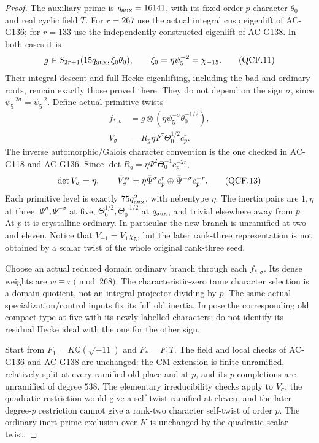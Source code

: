\begin{proof}
The auxiliary prime is \(q_{\rm aux}=16141\), with its fixed
order-\(p\) character \(\theta_0\) and real cyclic field \(T\).
For \(r=267\) use the actual integral cusp eigenlift of AC-G136;
for \(r=133\) use the independently constructed eigenlift of
AC-G138.  In both cases it is
\[
       g\in S_{2r+1}(15q_{\rm aux},\xi_0\theta_0),
       \qquad \xi_0=\eta\psi_5^{-2}=\chi_{-15}.
 \tag{QCF.11}
\]
Their integral descent and full Hecke eigenlifting, including the
bad and ordinary roots, remain exactly those proved there.  They
do not depend on the sign \(\sigma\), since
\(\psi_5^{-2\sigma}=\psi_5^{-2}\).
Define actual primitive twists
\[
 \begin{split}
 f_{*,\sigma}&=g\otimes
                 (\eta\psi_5^{-\sigma}\theta_0^{-1/2}),\\
 V_\sigma&=R_g\eta\Psi^\sigma\Theta_0^{1/2}c_p^r.
 \end{split}
 \tag{QCF.12}
\]
The inverse automorphic/Galois character convention is the one
checked in AC-G118 and AC-G136.  Since
\(\det R_g=\eta\Psi^2\Theta_0^{-1}c_p^{-2r}\),
\[
 \det V_\sigma=\eta,\qquad
 \bar V_\sigma^{\rm ss}=
     \eta\bar\Psi^\sigma\bar c_p^r
           \oplus\bar\Psi^{-\sigma}\bar c_p^{-r}.
 \tag{QCF.13}
\]
Each primitive level is exactly \(75q_{\rm aux}^2\), with
nebentype \(\eta\).  The inertia pairs are
\(1,\eta\) at three, \(\Psi^\sigma,\Psi^{-\sigma}\) at five,
\(\Theta_0^{1/2},\Theta_0^{-1/2}\) at \(q_{\rm aux}\),
and trivial elsewhere away from \(p\).  At \(p\) it is
crystalline ordinary.  In particular the new branch is unramified
at two and eleven.  Notice that \(V_{-1}=V_1\chi_5\), but
the later rank-three representation is not obtained by a scalar
twist of the whole original rank-three seed.

Choose an actual reduced domain ordinary branch through each
\(f_{*,\sigma}\).  Its dense weights are \(w\equiv r\pmod{268}\).
The characteristic-zero tame character selection is a domain
quotient, not an integral projector dividing by \(p\).
The same actual specialization/control inputs fix its full old
inertia.  Impose the corresponding old compact type at five
with its newly labelled characters; do not identify its residual
Hecke ideal with the one for the other sign.

Start from \(F_1=K\mathbb Q(\sqrt{-11})\) and \(F_*=F_1T\).
The field and local checks of AC-G136 and AC-G138 are unchanged:
the CM extension is finite-unramified, relatively split at every
ramified old place and at \(p\), and its \(p\)-completions are
unramified of degree \(538\).  The elementary irreducibility
checks apply to \(V_\sigma\): the quadratic restriction would
give a self-twist ramified at eleven, and the later degree-\(p\)
restriction cannot give a rank-two character self-twist of order
\(p\).  The ordinary inert-prime exclusion over \(K\) is
unchanged by the quadratic scalar twist.


\end{proof}
